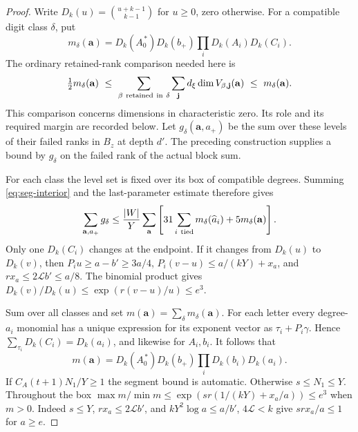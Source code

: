 \begin{proof}

Write \(D_k(u)=\binom{u+k-1}{k-1}\) for \(u\ge0\), zero
otherwise. For a compatible digit class \(\delta\), put
\[
 m_\delta(\mathbf a)=D_k(A_0^{\,*})D_k(b_+)
                  \prod_i D_k(A_i)D_k(C_i).
\]
The ordinary retained-rank comparison needed here is
\begin{equation}\label{eq:ordinary-class}
 \tfrac12 m_\delta(\mathbf a)\ \le\
   \sum_{\beta\ {\rm retained\ in}\ \delta}
       \sum_{\mathbf j} d_\xi\dim V_{\beta,\mathbf j}(\mathbf a)
   \ \le\ m_\delta(\mathbf a).
\end{equation}
This comparison concerns dimensions in characteristic zero.
Its role and its required margin are recorded below.
Let \(g_\delta(\mathbf a,a_+)\) be the sum over these levels
of their failed ranks in \(B_z\) at depth \(d'\).
The preceding construction supplies a bound by \(g_\delta\) on
the failed rank of the actual block sum.

For each class the
level set is fixed over its box of compatible degrees.
Summing \eqref{eq:seg-interior} and the last-parameter estimate
therefore gives
\[
 \sum_{\mathbf a,a_+}g_\delta
 \le \frac{|W|}{Y}
      \sum_{\mathbf a}\left[31\sum_{i\ {\rm tied}}
         m_\delta(\widehat a_i)+5m_\delta(\mathbf a)\right].
\]
Only one \(D_k(C_i)\) changes at the endpoint. If it changes from
\(D_k(u)\) to \(D_k(v)\), then \(P_i u\ge a-b'\ge3a/4\),
\(P_i(v-u)\le a/(kY)+x_a\), and
\(r x_a\le 2\mathcal L b'\le a/8\).
The binomial product gives \(D_k(v)/D_k(u)\le
\exp(r(v-u)/u)\le e^3\).

Sum over all classes and set \(m(\mathbf a)=\sum_\delta
m_\delta(\mathbf a)\). For each letter every degree-\(a_i\)
monomial has a unique expression for its exponent vector as
\(\tau_i+P_i\gamma\). Hence
\(\sum_{\tau_i}D_k(C_i)=D_k(a_i)\), and likewise for \(A_i,b_i\).
It follows that
\[
 m(\mathbf a)=D_k(A_0^{\,*})D_k(b_+)
                  \prod_i D_k(b_i)D_k(a_i).
\]
If \(C_A(t+1)N_1/Y\ge1\) the segment bound is automatic.
Otherwise \(s\le N_1\le Y\). Throughout the box
\(\max m/\min m\le\exp(sr(1/(kY)+x_a/a))\le e^3\)
when \(m>0\). Indeed \(s\le Y\),
\(rx_a\le2\mathcal L b'\), and
\(kY^2\log a\le a/b'\), \(4\mathcal L<k\) give
\(sr x_a/a\le1\) for \(a\ge e\).


\end{proof}
